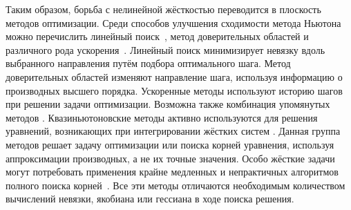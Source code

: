 Таким образом, борьба с нелинейной жёсткостью переводится в плоскость методов оптимизации.
Среди способов улучшения сходимости метода Ньютона можно перечислить линейный поиск~\cite{armijo1966minimization, wolfe1969convergence},
метод доверительных областей \cite{sorensen1982newton} и различного рода ускорения~\cite{anderson1965iterative, nesterov27method, brown1994convergence}.
Линейный поиск минимизирует невязку вдоль выбранного направления путём подбора оптимального шага.
Метод доверительных областей изменяют направление шага, используя информацию о производных высшего порядка.
Ускоренные методы используют историю шагов при решении задачи оптимизации.
Возможна также комбинация упомянутых методов \cite{brune2015composing}.
Квазиньютоновские методы активно используются для решения уравнений, возникающих при интегрировании жёстких систем
\cite{brown1985experiments, alexander1991modified, moore1994stepsize, schlenkrich2006application}.
Данная группа методов решает задачу оптимизации или поиска корней уравнения,
используя аппроксимации производных, а не их точные значения.
Особо жёсткие задачи могут потребовать применения крайне медленных и непрактичных алгоритмов
полного поиска корней~\cite{farrell2016computation}.
Все эти методы отличаются необходимым количеством вычислений невязки, якобиана или гессиана в ходе поиска решения.
